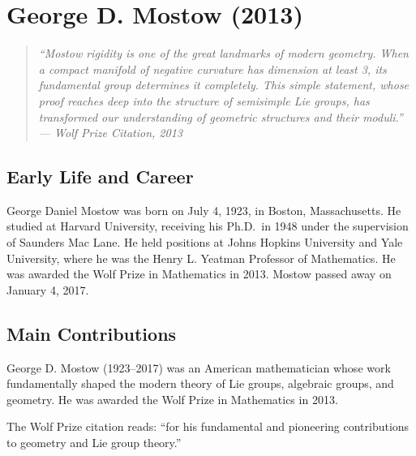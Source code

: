 \providecommand{\Isom}{\operatorname{Isom}}
\providecommand{\Vol}{\operatorname{Vol}}
\let\HH\relax
\newcommand{\HH}{\mathbb{H}}
\let\C\relax
\newcommand{\C}{\mathbb{C}}

\chapter{George D. Mostow (2013)}

\begin{quote}
\it ``Mostow rigidity is one of the great landmarks of modern geometry. When a compact manifold of negative curvature has dimension at least 3, its fundamental group determines it completely. This simple statement, whose proof reaches deep into the structure of semisimple Lie groups, has transformed our understanding of geometric structures and their moduli.'' --- Wolf Prize Citation, 2013
\end{quote}

\section{Early Life and Career}

George Daniel Mostow was born on July 4, 1923, in Boston, Massachusetts. He studied at Harvard University, receiving his Ph.D.\ in 1948 under the supervision of Saunders Mac Lane. He held positions at Johns Hopkins University and Yale University, where he was the Henry L. Yeatman Professor of Mathematics. He was awarded the Wolf Prize in Mathematics in 2013. Mostow passed away on January 4, 2017.

\section{Main Contributions}

George D. Mostow (1923--2017) was an American mathematician whose work fundamentally shaped the modern theory of Lie groups, algebraic groups, and geometry. He was awarded the Wolf Prize in Mathematics in 2013.

The Wolf Prize citation reads: ``for his fundamental and pioneering contributions to geometry and Lie group theory.''

